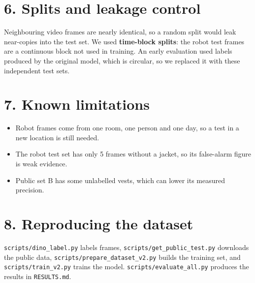 \documentclass[10.5pt]{article}
\begin{document}
\section{6. Splits and leakage control}
Neighbouring video frames are nearly identical, so a random split would leak near-copies into the test set. We used \textbf{time-block splits}: the robot test frames are a continuous block not used in training. An early evaluation used labels produced by the original model, which is circular, so we replaced it with these independent test sets.

\section{7. Known limitations}
\begin{itemize}
  \item Robot frames come from one room, one person and one day, so a test in a new location is still needed.
  \item The robot test set has only 5 frames without a jacket, so its false-alarm figure is weak evidence.
  \item Public set B has some unlabelled vests, which can lower its measured precision.
\end{itemize}

\section{8. Reproducing the dataset}
\texttt{scripts/dino\_label.py} labels frames, \texttt{scripts/get\_public\_test.py} downloads the public data, \texttt{scripts/prepare\_dataset\_v2.py} builds the training set, and \texttt{scripts/train\_v2.py} trains the model. \texttt{scripts/evaluate\_all.py} produces the results in \texttt{RESULTS.md}.
\end{document}

